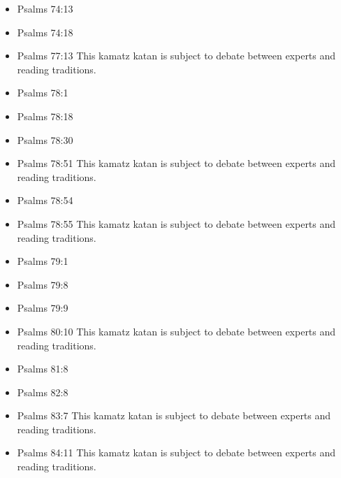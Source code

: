 \documentclass[14pt]{article}
\begin{document}
\begin{multicols}{2}
\begin{itemize}
			\item Psalms 74:13
			
			\item Psalms 74:18
			
			\item Psalms 77:13 This kamatz katan is subject to debate between experts and reading traditions.
			
			\item Psalms 78:1
			
			\item Psalms 78:18
			
			\item Psalms 78:30
			
			\item Psalms 78:51 This kamatz katan is subject to debate between experts and reading traditions.
			
			\item Psalms 78:54
			
			\item Psalms 78:55 This kamatz katan is subject to debate between experts and reading traditions.
			
			\item Psalms 79:1
			
			\item Psalms 79:8
					
					\item Psalms 79:9
					
					\item Psalms 80:10 This kamatz katan is subject to debate between experts and reading traditions.
					
					\item Psalms 81:8
					
					\item Psalms 82:8
					
					\item Psalms 83:7 This kamatz katan is subject to debate between experts and reading traditions.
					
					\item Psalms 84:11 This kamatz katan is subject to debate between experts and reading traditions.
					

\end{itemize}
\end{multicols}
\end{document}
